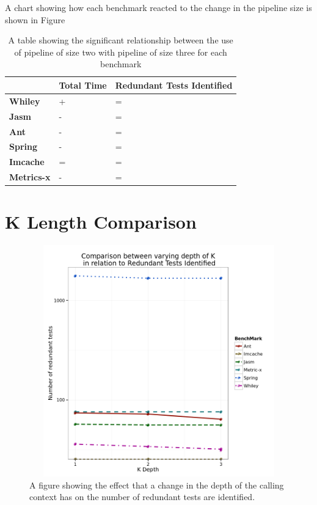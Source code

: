 A chart showing how each benchmark reacted to the change in the pipeline size is shown in Figure 

\begin{table}[]
\centering
\caption{A table showing the significant relationship between the use of pipeline of size two with pipeline of size three for each benchmark}
\label{pipelinesig}
\begin{tabular}{|l|l|l|}
\hline
{\bf }          & {\bf Total Time} & {\bf Redundant Tests Identified} \\ \hline
{\bf Whiley}    & +                & =                           \\ \hline
{\bf Jasm}      & -                & =                           \\ \hline
{\bf Ant}       & -                & =                           \\ \hline
{\bf Spring}    & -                & =                           \\ \hline
{\bf Imcache}   & =                & =                           \\ \hline
{\bf Metrics-x} & -                & =                           \\ \hline
\end{tabular}
\end{table}



\section{K Length Comparison}


\begin{figure}[h]
\begin{center}
\includegraphics[height=10cm, width = 14.5cm]{KDepth.png}
\end{center}
\caption{A figure showing the effect that a change in the depth of the calling context has on the number of redundant tests are identified.}
\label{fig:kdepthgraph}
\end{figure}

